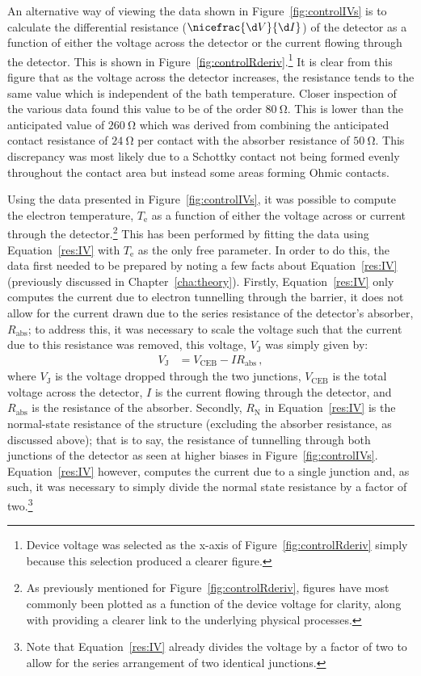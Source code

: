 An alternative way of viewing the data shown in Figure~\ref{fig:controlIVs} is to calculate the differential resistance ($\nicefrac{\d V}{\d I}$) of the detector as a function of either the voltage across the detector or the current flowing through the detector. This is shown in Figure~\ref{fig:controlRderiv}.\footnote{Device voltage was selected as the x-axis of Figure~\ref{fig:controlRderiv} simply because this selection produced a clearer figure.} It is clear from this figure that as the voltage across the detector increases, the resistance tends to the same value which is independent of the bath temperature. Closer inspection of the various data found this value to be of the order $80~\mathrm{\Omega}$. This is lower than the anticipated value of $260~\mathrm{\Omega}$ which was derived from combining the anticipated contact resistance of $24~\mathrm{\Omega}$ per contact with the absorber resistance of $50~\mathrm{\Omega}$. This discrepancy was most likely due to a Schottky contact not being formed evenly throughout the contact area but instead some areas forming Ohmic contacts.
\par 
Using the data presented in Figure~\ref{fig:controlIVs}, it was possible to compute the electron temperature, $T_{\mathrm{e}}$ as a function of either the voltage across or current through the detector.\footnote{As previously mentioned for Figure~\ref{fig:controlRderiv}, figures have most commonly been plotted as a function of the device voltage for clarity, along with providing a clearer link to the underlying physical processes.} This has been performed by fitting the data using Equation~\ref{res:IV} with $T_{\mathrm{e}}$ as the only free parameter. In order to do this, the data first needed to be prepared by noting a few facts about Equation~\ref{res:IV} (previously discussed in Chapter~\ref{cha:theory}). Firstly, Equation~\ref{res:IV} only computes the current due to electron tunnelling through the barrier, it does not allow for the current drawn due to the series resistance of the detector's absorber, $R_{\mathrm{abs}}$; to address this, it was necessary to scale the voltage such that the current due to this resistance was removed, this voltage, $V_{\mathrm{J}}$ was simply given by:
\begin{align}
V_{\mathrm{J}} &= V_{\mathrm{CEB}} - IR_{\mathrm{abs}}\,,
\end{align} 
where $V_{\mathrm{J}}$ is the voltage dropped through the two junctions, $V_{\mathrm{CEB}}$ is the total voltage across the detector, $I$ is the current flowing through the detector, and $R_{\mathrm{abs}}$ is the resistance of the absorber. Secondly, $R_{\mathrm{N}}$ in Equation~\ref{res:IV} is the normal-state resistance of the structure (excluding the absorber resistance, as discussed above); that is to say, the resistance of tunnelling through both junctions of the detector as seen at higher biases in Figure~\ref{fig:controlIVs}. Equation~\ref{res:IV} however, computes the current due to a single junction and, as such, it was necessary to simply divide the normal state resistance by a factor of two.\footnote{Note that Equation~\ref{res:IV} already divides the voltage by a factor of two to allow for the series arrangement of two identical junctions.}
